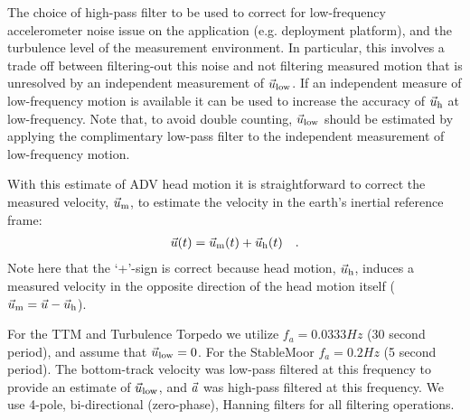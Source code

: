The choice of high-pass filter to be used to correct for low-frequency accelerometer noise issue on the application (e.g. deployment platform), and the turbulence level of the measurement environment. In particular, this involves a trade off between filtering-out this noise and not filtering measured motion that is unresolved by an independent measurement of $\vec{u}_\mathrm{low}$. If an independent measure of low-frequency motion is available it can be used to increase the accuracy of $\vec{u}_\mathrm{h}$ at low-frequency. Note that, to avoid double counting, $\vec{u}_\mathrm{low}$ should be estimated by applying the complimentary low-pass filter to the independent measurement of low-frequency motion.

With this estimate of ADV head motion it is straightforward to correct the measured velocity, $\vec{u}_\mathrm{m}$, to estimate the velocity in the earth's inertial reference frame:
\begin{align}
  \label{eqn:u_mot_def}
  \vec{u}(t) & = \vec{u}_\mathrm{m}(t) + \vec{u}_\mathrm{h}(t) &  .
\end{align}
Note here that the `+'-sign is correct because head motion, $\vec{u}_\mathrm{h}$, induces a measured velocity in the opposite direction of the head motion itself ($\vec{u}_\mathrm{m} = \vec{u} - \vec{u}_\mathrm{h}$).

For the TTM and Turbulence Torpedo we utilize $f_a = 0.0333 Hz$ (30 second period), and assume that $\vec{u}_\mathrm{low} = 0$. For the StableMoor $f_a = 0.2 Hz$ (5 second period). The bottom-track velocity was low-pass filtered at this frequency to provide an estimate of $\vec{u}_\mathrm{low}$, and ${\vec{a}}$ was high-pass filtered at this frequency. We use 4-pole, bi-directional (zero-phase), Hanning filters for all filtering operations. 




